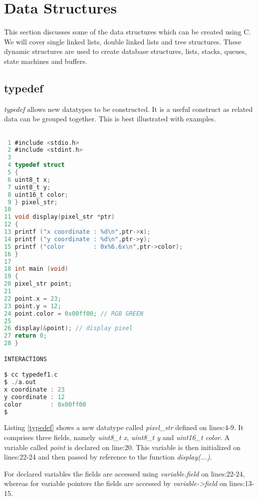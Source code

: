 \section{Data Structures} \label{datastructure}

This section discusses some of the data structures which can be created using C. We will cover single linked lists, double linked lists and tree structures. These dynamic structures are used to create database structures, lists, stacks, queues, state machines and buffers.

\subsection{typedef}

\textit{typedef} allows new datatypes to be constructed. It is a useful construct as related data can be grouped together. This is best illustrated with examples.

\begin{lstlisting}[language=C,showstringspaces=false,caption={File: typedef1.c, new datatype example},captionpos=b,label=typedef]

 1 #include <stdio.h>
 2 #include <stdint.h>
 3 
 4 typedef struct
 5 {
 6 uint8_t x;
 7 uint8_t y;
 8 uint16_t color;
 9 } pixel_str;
10 
11 void display(pixel_str *ptr)
12 {
13 printf ("x coordinate : %d\n",ptr->x);
14 printf ("y coordinate : %d\n",ptr->y);
15 printf ("color        : 0x%6.6x\n",ptr->color);
16 } 
17 
18 int main (void)
19 {
20 pixel_str point;
21 
22 point.x = 23;
23 point.y = 12;
24 point.color = 0x00ff00; // RGB GREEN
25 
26 display(&point); // display pixel
27 return 0;
28 }

INTERACTIONS

$ cc typedef1.c
$ ./a.out
x coordinate : 23
y coordinate : 12
color        : 0x00ff00
$
\end{lstlisting}

Listing \ref{typedef} shows a new datatype called \textit{pixel\_str} defined on lines:4-9. It comprises three fields, namely \textit{uint8\_t x}, \textit{uint8\_t y} and \textit{uint16\_t color}. A variable called \textit{point} is declared on line:20. This variable is then initialized on lines:22-24 and then passed by reference to the function \textit{display(...)}. 

For declared variables the fields are accessed using \textit{variable.field} on lines:22-24, whereas for variable pointers the fields are accessed by \textit{variable-\textgreater field} on lines:13-15.

